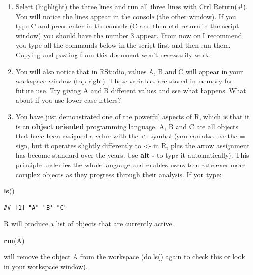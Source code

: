 \documentclass[]{book}
\newenvironment{Shaded}{\begin{snugshade}}{\end{snugshade}}
\newcommand{\KeywordTok}[1]{\textcolor[rgb]{0.13,0.29,0.53}{\textbf{#1}}}
\newcommand{\NormalTok}[1]{#1}
\begin{document}
\begin{enumerate}
\def\labelenumi{\arabic{enumi}.}
\setcounter{enumi}{8}
\item
  Select (highlight) the three lines and run all three lines with Ctrl Return(↲). You will notice the lines appear in the console (the other window). If you type C and press enter in the console (C and then ctrl return in the script window) you should have the number 3 appear. From now on I recommend you type all the commands below in the script first and then run them. Copying and pasting from this document won't necessarily work.
\item
  You will also notice that in RStudio, values A, B and C will appear in your workspace window (top right). These variables are stored in memory for future use. Try giving A and B different values and see what happens. What about if you use lower case letters?
\item
  You have just demonstrated one of the powerful aspects of R, which is that it is an \textbf{object oriented} programming language. A, B and C are all objects that have been assigned a value with the \textless{}- symbol (you can also use the = sign, but it operates slightly differently to \textless{}- in R, plus the arrow assignment has become standard over the years. Use \textbf{alt -} to type it automatically). This principle underlies the whole language and enables users to create ever more complex objects as they progress through their analysis. If you type:
\end{enumerate}

\begin{Shaded}
\begin{Highlighting}[]
\KeywordTok{ls}\NormalTok{()}
\end{Highlighting}
\end{Shaded}

\begin{verbatim}
## [1] "A" "B" "C"
\end{verbatim}

R will produce a list of objects that are currently active.

\begin{Shaded}
\begin{Highlighting}[]
\KeywordTok{rm}\NormalTok{(A)}
\end{Highlighting}
\end{Shaded}

will remove the object A from the workspace (do ls() again to check this or look in your workspace window).
\end{document}
